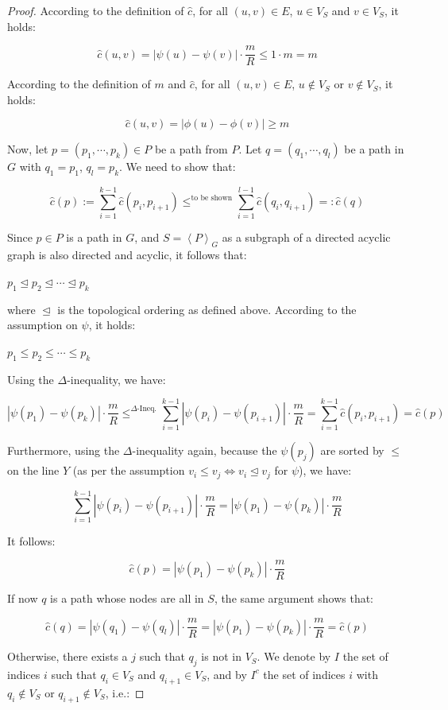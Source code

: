 \documentclass[11pt]{scrartcl}
\begin{document}
\begin{proof}
According to the definition of $\hat{c}$, for all $(u,v) \in E$, $u \in V_S$ and $v \in V_S$, it holds:

\[
\hat{c}(u,v) = |\psi(u)-\psi(v)| \cdot \frac{m}{R} \le 1 \cdot m = m
\]

According to the definition of $m$ and $\hat{c}$, for all $(u,v) \in E$, $u \notin V_S$ or $v \notin V_S$, it holds:

\[
\hat{c}(u,v) = |\phi(u)-\phi(v)| \ge m
\]

Now, let $p = (p_1,\cdots,p_k) \in P$ be a path from $P$. Let $q = (q_1,\cdots,q_l)$ be a path in $G$ with $q_1 = p_1$, $q_l = p_k$. We need to show that:

\[
\hat{c}(p) := \sum_{i=1}^{k-1} \hat{c}(p_i,p_{i+1}) \le^{\text{to be shown}} \sum_{i=1}^{l-1} \hat{c}(q_i,q_{i+1}) =:\hat{c}(q)
\]

Since $p \in P$ is a path in $G$, and $S = \left < P \right >_G$ as a subgraph of a directed acyclic graph is also directed and acyclic, it follows that:

$p_1 \trianglelefteq p_2 \trianglelefteq \cdots \trianglelefteq p_k$

where $\trianglelefteq$ is the topological ordering as defined above. According to the assumption on $\psi$, it holds:

$p_1 \le p_2 \le \cdots \le p_k$

Using the $\Delta$-inequality, we have:

\[
|\psi(p_1) -\psi(p_k)| \cdot \frac{m}{R} \le^{\Delta\text{-Ineq.}} \sum_{i=1}^{k-1} | \psi(p_i)-\psi(p_{i+1})| \cdot \frac{m}{R} = \sum_{i=1}^{k-1} \hat{c}(p_i,p_{i+1}) = \hat{c}(p)
\]

Furthermore, using the $\Delta$-inequality again, because the $\psi(p_j)$ are sorted by $\le$ on the line $Y$ (as per the assumption $v_i \leq v_j \iff v_i \trianglelefteq v_j$ for $\psi$), we have:

\[
\sum_{i=1}^{k-1} | \psi(p_i)-\psi(p_{i+1})| \cdot \frac{m}{R} =|\psi(p_1) -\psi(p_k)| \cdot \frac{m}{R}
\]

It follows:

\[
\hat{c}(p)=|\psi(p_1) -\psi(p_k)| \cdot \frac{m}{R}
\]

If now $q$ is a path whose nodes are all in $S$, the same argument shows that:

\[
\hat{c}(q) = |\psi(q_1) -\psi(q_l)| \cdot \frac{m}{R} = |\psi(p_1)-\psi(p_k)| \cdot \frac{m}{R} = \hat{c}(p)
\]

Otherwise, there exists a $j$ such that $q_j$ is not in $V_S$. We denote by $I$ the set of indices $i$ such that $q_i \in V_S$ and $q_{i+1} \in V_S$, and by $I^c$ the set of indices $i$ with $q_i \notin V_S$ or $q_{i+1} \notin V_S$, i.e.:


\end{proof}
\end{document}
